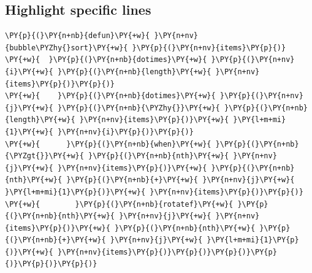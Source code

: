 \subsection{Highlight specific lines}
\begin{tscode}[lang=lisp, hl_lines={2-3}, engine=pygments]
\begin{Verbatim}[commandchars=\\\{\},breaklines, breakanywhere, commandchars=\\\{\},highlightlines={2-3}]
\PY{p}{(}\PY{n+nb}{defun}\PY{+w}{ }\PY{n+nv}{bubble\PYZhy{}sort}\PY{+w}{ }\PY{p}{(}\PY{n+nv}{items}\PY{p}{)}
\PY{+w}{  }\PY{p}{(}\PY{n+nb}{dotimes}\PY{+w}{ }\PY{p}{(}\PY{n+nv}{i}\PY{+w}{ }\PY{p}{(}\PY{n+nb}{length}\PY{+w}{ }\PY{n+nv}{items}\PY{p}{)}\PY{p}{)}
\PY{+w}{    }\PY{p}{(}\PY{n+nb}{dotimes}\PY{+w}{ }\PY{p}{(}\PY{n+nv}{j}\PY{+w}{ }\PY{p}{(}\PY{n+nb}{\PYZhy{}}\PY{+w}{ }\PY{p}{(}\PY{n+nb}{length}\PY{+w}{ }\PY{n+nv}{items}\PY{p}{)}\PY{+w}{ }\PY{l+m+mi}{1}\PY{+w}{ }\PY{n+nv}{i}\PY{p}{)}\PY{p}{)}
\PY{+w}{      }\PY{p}{(}\PY{n+nb}{when}\PY{+w}{ }\PY{p}{(}\PY{n+nb}{\PYZgt{}}\PY{+w}{ }\PY{p}{(}\PY{n+nb}{nth}\PY{+w}{ }\PY{n+nv}{j}\PY{+w}{ }\PY{n+nv}{items}\PY{p}{)}\PY{+w}{ }\PY{p}{(}\PY{n+nb}{nth}\PY{+w}{ }\PY{p}{(}\PY{n+nb}{+}\PY{+w}{ }\PY{n+nv}{j}\PY{+w}{ }\PY{l+m+mi}{1}\PY{p}{)}\PY{+w}{ }\PY{n+nv}{items}\PY{p}{)}\PY{p}{)}
\PY{+w}{        }\PY{p}{(}\PY{n+nb}{rotatef}\PY{+w}{ }\PY{p}{(}\PY{n+nb}{nth}\PY{+w}{ }\PY{n+nv}{j}\PY{+w}{ }\PY{n+nv}{items}\PY{p}{)}\PY{+w}{ }\PY{p}{(}\PY{n+nb}{nth}\PY{+w}{ }\PY{p}{(}\PY{n+nb}{+}\PY{+w}{ }\PY{n+nv}{j}\PY{+w}{ }\PY{l+m+mi}{1}\PY{p}{)}\PY{+w}{ }\PY{n+nv}{items}\PY{p}{)}\PY{p}{)}\PY{p}{)}\PY{p}{)}\PY{p}{)}\PY{p}{)}
\end{Verbatim}
\end{tscode}
